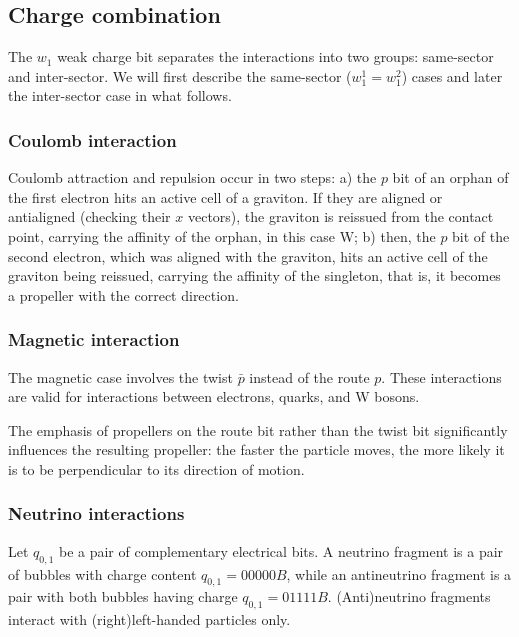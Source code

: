 \documentclass[12pt,english]{article}
\begin{document}
\subsection{Charge combination}

The $w_{1}$ weak charge bit separates the interactions into two groups:
same-sector and inter-sector. We will first describe the same-sector ($w_{1}^{1}=w_{1}^{2}$) cases and later the inter-sector case in what follows.

\subsubsection{Coulomb interaction} \label{subsec:Coulomb-interaction}

Coulomb attraction and repulsion occur in two steps: a) the $p$ bit of an orphan of the first electron hits an active cell of a graviton. If they are aligned or antialigned (checking their $x$ vectors), the graviton is reissued from the contact point, carrying the affinity of the orphan, in this case W; b) then, the $p$ bit of the second electron, which was aligned with the graviton, hits an active cell of the graviton being reissued, carrying the affinity of the singleton, that is, it becomes a propeller with the correct direction.

\subsubsection{Magnetic interaction}

The magnetic case involves the twist $\bar{p}$ instead of the route $p$. These interactions are valid for interactions between electrons, quarks, and W bosons.

The emphasis of propellers on the route bit rather than the twist bit significantly influences the resulting propeller: the faster the particle moves, the more likely it is to be perpendicular to its direction of motion.

\subsubsection{Neutrino interactions}

Let $q_{0,1}$ be a pair of complementary electrical bits. A neutrino fragment is a pair of bubbles with charge content $q_{0,1} = 00000B$, while an antineutrino fragment is a pair with both bubbles having charge $q_{0,1} = 01111B$. (Anti)neutrino fragments interact with (right)left-handed particles only.
\end{document}
